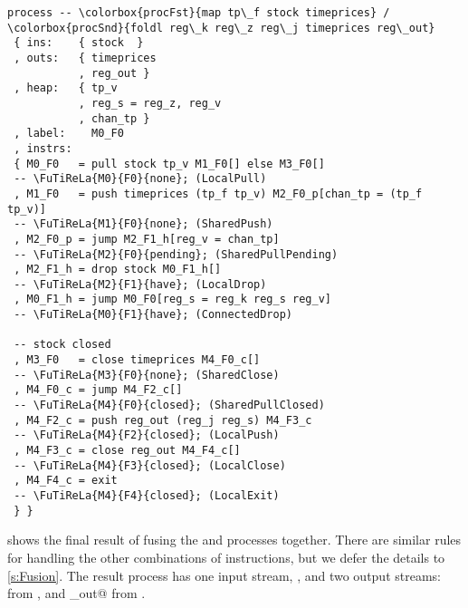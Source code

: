 \begin{lstlisting}[language=process,float,caption={[Fusion of timeprices and regression, along with shared instructions and variables]Fusion of \colorbox{procFst}{timeprices} and \colorbox{procSnd}{regression}, along with \colorbox{procCommon}{shared} instructions and variables},label=figs/procs/instance/fused-timeprices-regression,linebackgroundcolor={
  \hilineFst{2}
  \hilineFst{3}
  \hilineSnd{4}
  \hilineFst{5}
  \hilineSnd{6}
  \hilineCom{7}
  \hilineFst{10}
  \hilineFst{11}
  \hilineFst{12}
  \hilineFst{13}
  \hilineSnd{14}
  \hilineSnd{15}
  \hilineFst{16}
  \hilineFst{17}
  \hilineSnd{18}
  \hilineSnd{19}
  \hilineFst{22}
  \hilineFst{23}
  \hilineSnd{24}
  \hilineSnd{25}
  \hilineSnd{26}
  \hilineSnd{27}
  \hilineSnd{28}
  \hilineSnd{29}
  \hilineCom{30}
  \hilineCom{31}
  }]
process -- \colorbox{procFst}{map tp\_f stock timeprices} / \colorbox{procSnd}{foldl reg\_k reg\_z reg\_j timeprices reg\_out}
 { ins:    { stock  }
 , outs:   { timeprices
           , reg_out }
 , heap:   { tp_v
           , reg_s = reg_z, reg_v
           , chan_tp }
 , label:    M0_F0
 , instrs:
 { M0_F0   = pull stock tp_v M1_F0[] else M3_F0[]
 -- \FuTiReLa{M0}{F0}{none}; (LocalPull)
 , M1_F0   = push timeprices (tp_f tp_v) M2_F0_p[chan_tp = (tp_f tp_v)]
 -- \FuTiReLa{M1}{F0}{none}; (SharedPush)
 , M2_F0_p = jump M2_F1_h[reg_v = chan_tp]
 -- \FuTiReLa{M2}{F0}{pending}; (SharedPullPending)
 , M2_F1_h = drop stock M0_F1_h[] 
 -- \FuTiReLa{M2}{F1}{have}; (LocalDrop)
 , M0_F1_h = jump M0_F0[reg_s = reg_k reg_s reg_v]
 -- \FuTiReLa{M0}{F1}{have}; (ConnectedDrop)

 -- stock closed
 , M3_F0   = close timeprices M4_F0_c[] 
 -- \FuTiReLa{M3}{F0}{none}; (SharedClose)
 , M4_F0_c = jump M4_F2_c[] 
 -- \FuTiReLa{M4}{F0}{closed}; (SharedPullClosed)
 , M4_F2_c = push reg_out (reg_j reg_s) M4_F3_c 
 -- \FuTiReLa{M4}{F2}{closed}; (LocalPush)
 , M4_F3_c = close reg_out M4_F4_c[] 
 -- \FuTiReLa{M4}{F3}{closed}; (LocalClose)
 , M4_F4_c = exit
 -- \FuTiReLa{M4}{F4}{closed}; (LocalExit)
 } }
\end{lstlisting}

 shows the final result of fusing the \lstiproc@map@ and \lstiproc@regression@ processes together.
There are similar rules for handling the other combinations of instructions, but we defer the details to \cref{s:Fusion}.
The result process has one input stream, \lstiproc@stock@, and two output streams: \lstiproc@timeprices@ from \lstiproc@map@, and \lstiproc@reg_out@ from \lstiproc@regression@.

